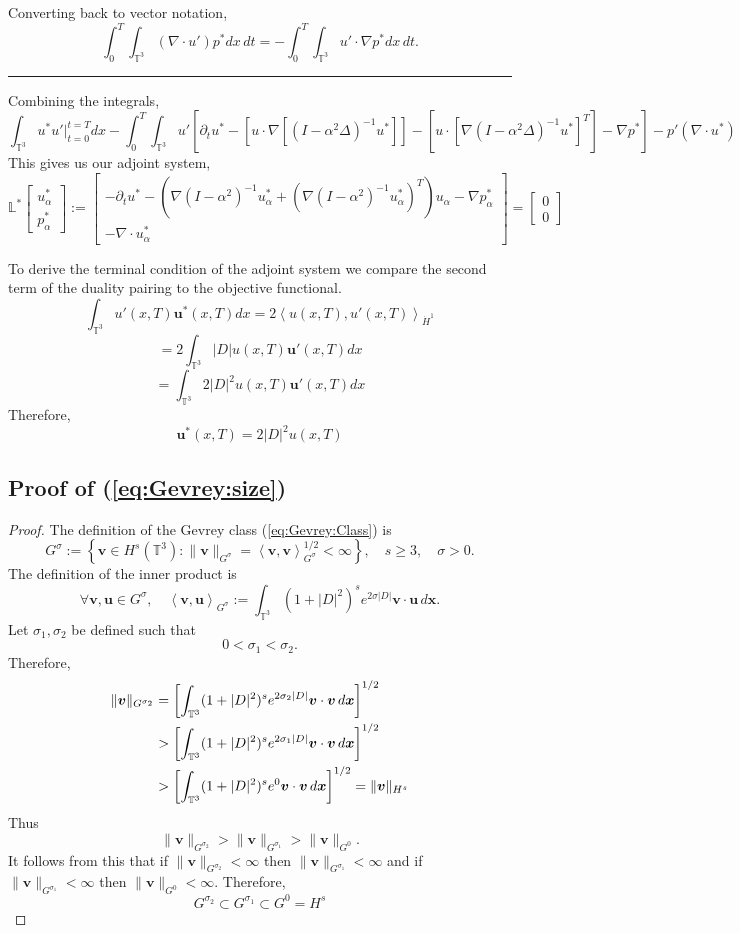 \documentclass[12pt]{article}
\newcommand{\la}{\left\langle}
\newcommand{\ra}{\right\rangle}
\newcommand{\lb}{\left\lbrace}
\newcommand{\rb}{\right\rbrace}
\def\hdo{\dot{H}^1}
\def\u{\boldsymbol u}
\def\v{\boldsymbol v}
\def\x{\boldsymbol x}
\def\TT{\mathbb{T}}
\numberwithin{equation}{section}
\begin{document}
Converting back to vector notation,
$$\int_0^T\int_{\mathbb{T}^3}(\nabla \cdot u')p^* dx\,dt = -\int_0^T\int_{\mathbb{T}^3} u'\cdot \nabla p^* dx\,dt.$$
\begin{center}
\noindent\rule{19cm}{0.4pt}
\end{center}
Combining the integrals,
$$\int_{\mathbb{T}^3}u^*u'|_{t=0}^{t=T} dx - \int_0^T\int_{\mathbb{T}^3} u'\left[\partial_t u^* - \left[u \cdot \nabla\left[(I-\alpha^2\Delta)^{-1}u^* \right]\right]-\left[ u \cdot \left[ \nabla (I-\alpha^2\Delta)^{-1} u^* \right]^T \right] - \nabla p^* \right] - p'(\nabla \cdot u^*)$$
This gives us our adjoint system,
$$\mathbb{L}^*\begin{bmatrix}
u_{\alpha}^*\\
p_{\alpha}^*
\end{bmatrix} := \begin{bmatrix}
-\partial_tu^*-(\nabla (I-\alpha^2)^{-1}u_{\alpha}^* + (\nabla (I-\alpha^2)^{-1}u_{\alpha}^*)^T)u_{\alpha}-\nabla p_{\alpha}^*\\
-\nabla \cdot u_{\alpha}^*
\end{bmatrix} = \begin{bmatrix}
0\\
0
\end{bmatrix}$$

To derive the terminal condition of the adjoint system we compare the second term of the duality pairing to the objective functional.
$$\int_{\TT^3}u'(x,T)\u^*(x,T) dx = 2\la u(x,T),u'(x,T)\ra_{\hdo}$$
$$ = 2\int_{\TT^3}|D|u(x,T)\u'(x,T) dx$$
$$ = \int_{\TT^3}2|D|^2u(x,T)\u'(x,T)dx$$
Therefore,
$$\u^*(x,T) = 2|D|^2u(x,T)$$

\subsection{Proof of (\ref{eq:Gevrey:size})}\label{app:Gevrey:size}

\begin{proof}
The definition of the Gevrey class (\ref{eq:Gevrey:Class}) is
$$
G^\sigma := \lb \v\in H^s(\TT^3) : \|\v\|_{G^\sigma} = \la \v,\v\ra_{G^\sigma}^{1/2}<\infty \rb, \quad s\geq 3, \quad \sigma > 0.
$$
The definition of the inner product is
$$\forall \v,\u \in G^\sigma, \quad \la \v,\u \ra_{G^\sigma} := \int_{\TT^3}(1+|D|^2)^se^{2\sigma |D|}\v\cdot \u \, d\x.$$
Let $\sigma_1, \sigma_2$ be defined such that
$$0 < \sigma_1 < \sigma_2.$$
Therefore,
\begin{align}
\notag
\|\v\|_{G^{\sigma_2}} &=\left[ \int_{\TT^3}(1+|D|^2)^{s}e^{2\sigma_2 |D|}\v\cdot \v \, d\x\right]^{1/2}\\
\notag
&> \left[ \int_{\TT^3}(1+|D|^2)^{s}e^{2 \sigma_1 |D|}\v\cdot \v \, d\x\right]^{1/2} \\
\notag
&> \left[ \int_{\TT^3}(1+|D|^2)^{s}e^{0}\v\cdot \v \, d\x\right]^{1/2} = \|\v\|_{H^s}
\end{align}
Thus
$$\|\v\|_{G^{\sigma_2}} > \|\v\|_{G^{\sigma_1}} > \|\v\|_{G^{0}}.$$
It follows from this that if $\|\v\|_{G^{\sigma_2}} < \infty$ then $\|\v\|_{G^{\sigma_1}} < \infty$ and if $\|\v\|_{G^{\sigma_1}} < \infty$ then $\|\v\|_{G^{0}} < \infty$. Therefore, 
$$G^{\sigma_2} \subset G^{\sigma_1} \subset G^0 = H^s$$
\end{proof}




\end{document}
